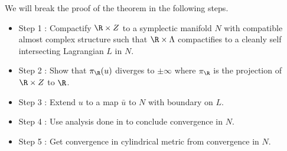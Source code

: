 \noindent We will break the proof of the theorem in the following steps.
\begin{itemize}
    \item Step 1 : Compactify $\R \times Z$ to a symplectic manifold $N$ with compatible almost complex structure such that $\R \times \Lambda$ compactifies to a cleanly self intersecting Lagrangian $L$ in $N$.
    \item Step 2 : Show that $\pi_\R (u)$ diverges to $\pm \infty$ where $\pi_\R$ is the projection of $\R \times Z$ to $\R$.
    \item Step 3 : Extend $u$ to a map  $\bar{u}$ to $N$ with boundary on $L$.
    \item Step 4 : Use analysis done in \cite{schm} to conclude convergence in $N$.
    \item Step 5 : Get convergence in cylindrical metric from convergence in $N$.
\end{itemize}

